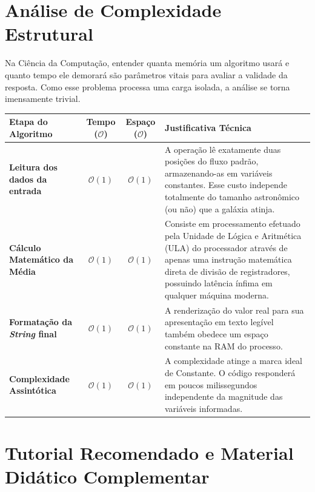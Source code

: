 \documentclass[11pt]{article}
\begin{document}
\newpage
\section*{Análise de Complexidade Estrutural}

Na Ciência da Computação, entender quanta memória um algoritmo usará e quanto tempo ele demorará são parâmetros vitais para avaliar a validade da resposta. Como esse problema processa uma carga isolada, a análise se torna imensamente trivial.

\vspace{0.8cm}

\begin{table}[h]
\centering
\renewcommand{\arraystretch}{1.5}
\begin{tabularx}{\textwidth}{>{\bfseries}l c c X}
\toprule
Etapa do Algoritmo & Tempo ($\mathcal{O}$) & Espaço ($\mathcal{O}$) & Justificativa Técnica \\
\midrule
Leitura dos dados da entrada & $\mathcal{O}(1)$ & $\mathcal{O}(1)$ & A operação lê exatamente duas posições do fluxo padrão, armazenando-as em variáveis constantes. Esse custo independe totalmente do tamanho astronômico (ou não) que a galáxia atinja. \\
Cálculo Matemático da Média & $\mathcal{O}(1)$ & $\mathcal{O}(1)$ & Consiste em processamento efetuado pela Unidade de Lógica e Aritmética (ULA) do processador através de apenas uma instrução matemática direta de divisão de registradores, possuindo latência ínfima em qualquer máquina moderna. \\
Formatação da \textit{String} final & $\mathcal{O}(1)$ & $\mathcal{O}(1)$ & A renderização do valor real para sua apresentação em texto legível também obedece um espaço constante na RAM do processo.\\
\midrule
\textbf{Complexidade Assintótica} & $\mathcal{O}(1)$ & $\mathcal{O}(1)$ & A complexidade atinge a marca ideal de Constante. O código responderá em poucos milissegundos independente da magnitude das variáveis informadas. \\
\bottomrule
\end{tabularx}
\end{table}

\vspace{1cm}

\section*{Tutorial Recomendado e Material Didático Complementar}
\end{document}
